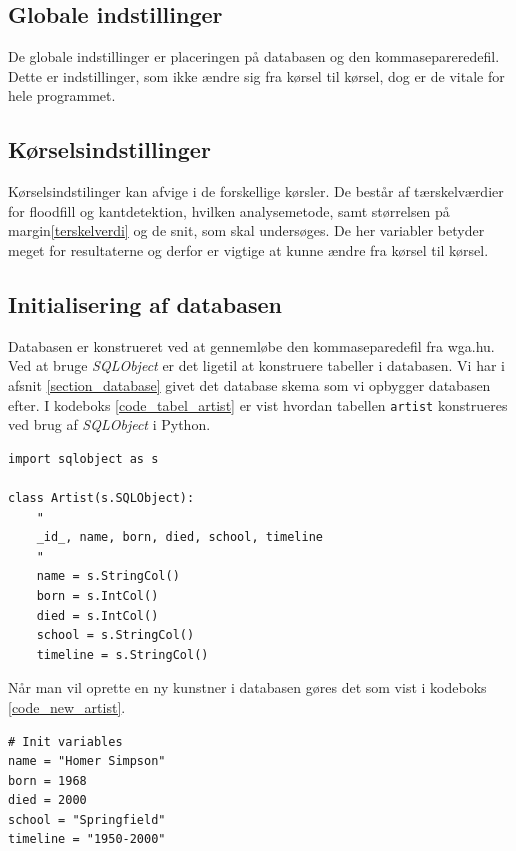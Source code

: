{\subsection{Globale indstillinger}
De globale indstillinger er placeringen på databasen og den
kommasepareredefil. Dette er indstillinger, som ikke ændre sig fra
kørsel til kørsel, dog er de vitale for hele programmet.

\subsection{Kørselsindstillinger}
Kørselsindstilinger kan afvige i de forskellige kørsler. De består af
tærskelværdier for floodfill og kantdetektion, hvilken analysemetode,
samt størrelsen på margin\ref{terskelverdi} og de snit, som
skal undersøges. De her variabler betyder meget for resultaterne og derfor er vigtige
at kunne ændre fra kørsel til kørsel. 

\subsection{Initialisering af databasen}
Databasen er konstrueret ved at gennemløbe den kommaseparedefil fra
wga.hu.
Ved at bruge \emph{SQLObject} er det ligetil at konstruere tabeller i
databasen. Vi har i afsnit \ref{section_database} givet det database
skema som vi opbygger databasen efter. I kodeboks
\ref{code_tabel_artist} er vist hvordan tabellen \texttt{artist}
konstrueres ved brug af \emph{SQLObject} i Python.

\begin{lstlisting}[caption={Pythonkode for oprettelse af tabeller i
    databasen.}, captionpos=b, label={code_tabel_artist}, frame=tb,
    breaklines=false, float=hb]
import sqlobject as s

class Artist(s.SQLObject):
    "
    _id_, name, born, died, school, timeline
    "
    name = s.StringCol()
    born = s.IntCol()
    died = s.IntCol()
    school = s.StringCol()
    timeline = s.StringCol()
\end{lstlisting}

Når man vil oprette en ny kunstner i databasen gøres det som vist
i kodeboks \ref{code_new_artist}.

\begin{lstlisting}[caption={Oprettelse af en kunstner i databasen.},
    captionpos=b, label={code_new_artist}, frame=tb, breaklines=false,
    float=h]
# Init variables
name = "Homer Simpson"
born = 1968
died = 2000
school = "Springfield"
timeline = "1950-2000"


\end{lstlisting}}
